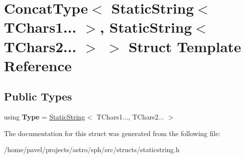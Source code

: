 \hypertarget{structConcatType_3_01StaticString_3_01TChars1_8_8_8_01_4_00_01StaticString_3_01TChars2_8_8_8_01_4_01_4}{}\section{Concat\+Type$<$ Static\+String$<$ T\+Chars1... $>$, Static\+String$<$ T\+Chars2... $>$ $>$ Struct Template Reference}
\label{structConcatType_3_01StaticString_3_01TChars1_8_8_8_01_4_00_01StaticString_3_01TChars2_8_8_8_01_4_01_4}
\subsection*{Public Types}
\begin{DoxyCompactItemize}
\item 
\hypertarget{structConcatType_3_01StaticString_3_01TChars1_8_8_8_01_4_00_01StaticString_3_01TChars2_8_8_8_01_4_01_4_afb951459936bdb8cd9910721e18a1aa6}{}\label{structConcatType_3_01StaticString_3_01TChars1_8_8_8_01_4_00_01StaticString_3_01TChars2_8_8_8_01_4_01_4_afb951459936bdb8cd9910721e18a1aa6} 
using {\bfseries Type} = \hyperlink{structStaticString}{Static\+String}$<$ T\+Chars1..., T\+Chars2... $>$
\end{DoxyCompactItemize}


The documentation for this struct was generated from the following file\+:\begin{DoxyCompactItemize}
\item 
/home/pavel/projects/astro/sph/src/structs/staticstring.\+h\end{DoxyCompactItemize}
